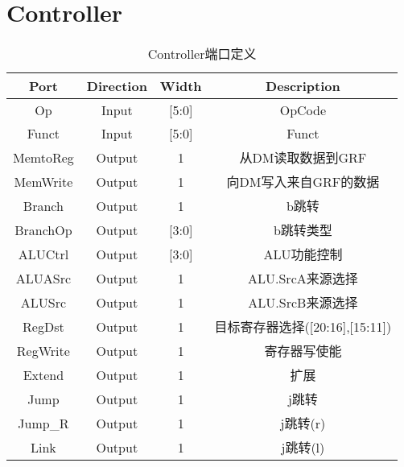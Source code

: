 \documentclass[UTF8]{ctexart}
\begin{document}
\section{Controller}
\begin{table}[H]
	\centering
	\begin{threeparttable}
		\caption{Controller端口定义}
		\begin{tabular}{cccc}
			\toprule
			\rowcolor{mypink}
			\textbf{Port} & \textbf{Direction} & \textbf{Width} & \textbf{Description}            \\
			\midrule
			Op            & Input              & [5:0]          & OpCode                          \\
			\midrule
			Funct         & Input              & [5:0]          & Funct                           \\
			\midrule
			MemtoReg      & Output             & 1              & 从DM读取数据到GRF               \\
			\midrule
			MemWrite      & Output             & 1              & 向DM写入来自GRF的数据           \\
			\midrule
			Branch        & Output             & 1              & b跳转                           \\
			\midrule
			BranchOp      & Output             & [3:0]          & b跳转类型                       \\
			\midrule
			ALUCtrl       & Output             & [3:0]          & ALU功能控制                     \\
			\midrule
			ALUASrc       & Output             & 1              & ALU.SrcA来源选择                \\
			\midrule
			ALUSrc        & Output             & 1              & ALU.SrcB来源选择                \\
			\midrule
			RegDst        & Output             & 1              & 目标寄存器选择([20:16],[15:11]) \\
			\midrule
			RegWrite      & Output             & 1              & 寄存器写使能                    \\
			\midrule
			Extend        & Output             & 1              & 扩展                            \\
			\midrule
			Jump          & Output             & 1              & j跳转                           \\
			\midrule
			Jump\_R       & Output             & 1              & j跳转(r)                        \\
			\midrule
			Link          & Output             & 1              & j跳转(l)                        \\
			\midrule
		\end{tabular}
	\end{threeparttable}
\end{table}
\end{document}
